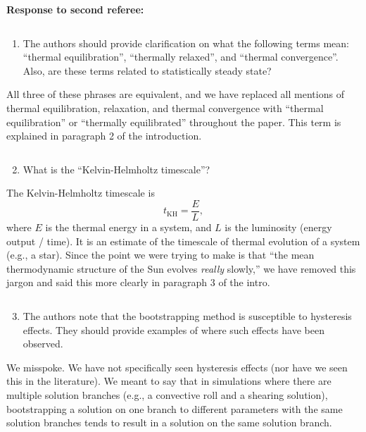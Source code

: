 \documentclass[aps, 11pt, singlecolumn]{revtex4-1} %
\begin{document}
\begin{singlespace}
\newpage
\noindent
\Large{\textbf{Response to second referee:}}\newline$\,$\newline\indent
\begin{myquotation}
$\,$\\\vspace{-1.25cm}
\begin{enumerate}
\item The authors should provide clarification on what the following terms mean: ``thermal equilibration'', ``thermally relaxed'', and ``thermal convergence''. Also, are these terms related to statistically steady state?
\end{enumerate}
\end{myquotation}
All three of these phrases are equivalent, and we have replaced all mentions of
thermal equilibration, relaxation, and thermal convergence with ``thermal
equilibration'' or ``thermally equilibrated'' throughout the paper. This term
is explained in paragraph 2 of the introduction.
\begin{myquotation}
$\,$\\\vspace{-1.25cm}
\begin{enumerate}
\setcounter{enumi}{1}
\item What is the ``Kelvin-Helmholtz timescale''?
\end{enumerate}
\end{myquotation}
The Kelvin-Helmholtz timescale is 
$$
t_{\text{KH}} = \frac{E}{L},
$$
where $E$ is the thermal energy in a system, and $L$ is the luminosity
(energy output / time). It is an estimate of the timescale
of thermal evolution of a system 
(e.g., a star). Since the point we were trying to make is that ``the mean 
thermodynamic structure of the Sun evolves \emph{really} slowly,''
we have removed this jargon and said this more clearly in paragraph 3 of the intro.

\begin{myquotation}
$\,$\\\vspace{-1.25cm}
\begin{enumerate}
\setcounter{enumi}{2}
\item The authors note that the bootstrapping method is susceptible to hysteresis effects. They should provide examples of where such effects have been observed.
\end{enumerate}
\end{myquotation}
We misspoke. We have not specifically seen hysteresis effects (nor have we seen
this in the literature).  We meant to say that in simulations where there are
multiple solution branches (e.g., a convective roll and a shearing solution),
bootstrapping a solution on one branch to different parameters with the same
solution branches tends to result in a solution on the 
same solution branch. 


\end{singlespace}
\end{document}
